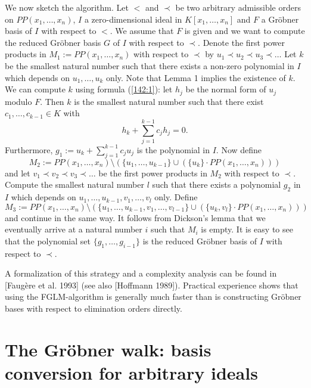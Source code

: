 \medskip
We now sketch the algorithm.
Let $<$ and $\prec$ be two arbitrary
admissible orders on $PP(x_1,\ldots,x_n)$,
$I$ a zero-dimensional ideal in $K[x_1,\ldots,x_n]$ and $F$ a Gr\"obner basis
of $I$ with respect to $<$. We assume that $F$ is given and
we want to compute the reduced Gr\"obner basis $G$ of $I$ 
with respect to $\prec$. Denote the first power products in 
$M_1:=PP(x_1,\ldots,x_n)$ with respect to $\prec$
by $u_1\prec u_2\prec u_3\prec\ldots$ Let $k$ be the smallest
natural number such that there exists a non-zero polynomial in $I$ which
depends on $u_1,\ldots,u_k$ only. Note that Lemma 1 implies the 
existence of $k$. We can compute $k$ using formula (\ref{142:1}): let
$h_j$ be the normal form of $u_j$ modulo $F$. Then $k$ is the smallest
natural number such that there exist $c_1,\ldots,c_{k-1}\in K$ with
\[ h_k+\sum_{j=1}^{k-1} c_j h_j=0. \]
Furthermore, $g_1:=u_k+\sum_{j=1}^{k-1} c_j u_j$ is the polynomial in $I$. Now define 
\[ M_2:=PP(x_1,\ldots,x_n)\setminus (\{u_1,\ldots,u_{k-1}\}\cup 
(\{u_k\}\cdot PP(x_1,\ldots,x_n))) \]
and let $v_1\prec v_2\prec v_3\prec\ldots$ be the first
power products in $M_2$ with respect to $\prec$. Compute the smallest natural number $l$
such that there exists a polynomial $g_2$ in $I$ which
depends on $u_1,\ldots,u_{k-1},v_1,\ldots,v_l$ only. Define
\[ M_3:=PP(x_1,\ldots,x_n)\setminus (\{u_1,\ldots,u_{k-1},v_1,\ldots,v_{l-1}\}\cup 
(\{u_k,v_l\}\cdot PP(x_1,\ldots,x_n))) \]
and continue in the same way. It follows from Dickson's lemma
that we eventually arrive at a natural number $i$ such that
$M_i$ is empty. It is easy to see that the polynomial set $\{g_1,\ldots,g_{i-1}\}$
is the reduced Gr\"obner basis of $I$ with respect to $\prec$.

\smallskip
A formalization of this strategy 
and a complexity analysis can be found in [Faug{\`e}re et al. 1993]
(see also [Hoffmann 1989]). 
Practical experience shows that using
the FGLM-algorithm is generally much faster than
is constructing Gr\"obner bases with respect to
elimination orders
directly.





\section{The Gr\"obner walk: basis conversion for arbitrary ideals}

